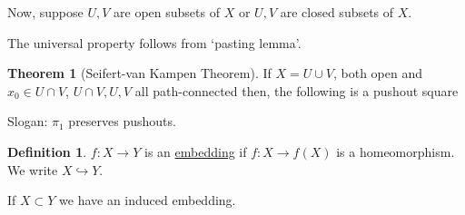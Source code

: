 \documentclass{article}
\theoremstyle{definition}
\newtheorem*{definition}{Definition}
\newtheorem{theorem}{Theorem}
\begin{document}
    Now, suppose \(U,V\) are open subsets of \(X\) or \(U,V\) are closed subsets of \(X\).
    
    \begin{center}
    \end{center}

    The universal property follows from `pasting lemma'.

    \begin{theorem}
        [Seifert-van Kampen Theorem] If \(X = U \cup V\), both open and \(x_0 \in U\cap V\), \(U\cap V, U, V\) all path-connected then, the following is a pushout square

        \begin{center}
        \end{center}

        Slogan: \(\pi_1\) preserves pushouts.

    \end{theorem}

    \begin{definition}
        \(f: X \to Y\) is an \underline{embedding} if \(f: X \to f(X)\) is a homeomorphism. We write \(X \hookrightarrow Y\).

        If \(X \subset Y\) we have an induced embedding.
    \end{definition}
\end{document}
